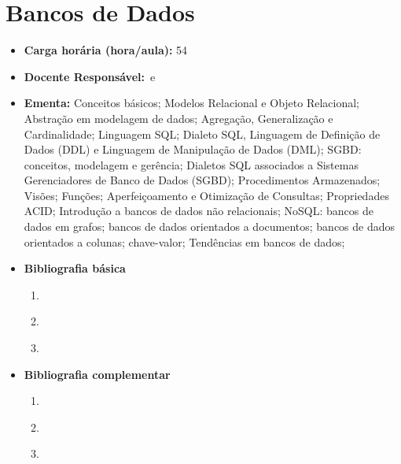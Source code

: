\documentclass[11pt,fleqn]{book} %
\begin{document}

\newpage
\section{Bancos de Dados}\label{disc:bancodados}

\begin{itemize}
	\item \textbf{Carga horária (hora/aula):} 54
	\item \textbf{Docente Responsável:}~e~
	\item \textbf{Ementa:} 
	Conceitos básicos;
	Modelos Relacional e Objeto Relacional;
	Abstração em modelagem de dados; 
	Agregação, Generalização e Cardinalidade; 
	Linguagem SQL; 
	Dialeto SQL, Linguagem de Definição de Dados (DDL) e Linguagem de Manipulação de Dados (DML);
	SGBD: conceitos, modelagem e gerência;
	Dialetos SQL associados a Sistemas Gerenciadores de Banco de Dados (SGBD);
	Procedimentos Armazenados; 
	Visões; 
	Funções; 
	Aperfeiçoamento e Otimização de Consultas;
	Propriedades ACID;
	Introdução a bancos de dados não relacionais;
	NoSQL: bancos de dados em grafos; bancos de dados orientados a documentos; bancos de dados orientados a colunas; chave-valor;
	Tendências em bancos de dados;
	\item \textbf{Bibliografia básica}
	\begin{enumerate}
		\item~\cite{silberschatz2016}
		\item~\cite{date2004}
		\item~\cite{heuser2009}
	\end{enumerate}
	\item \textbf{Bibliografia complementar}
	\begin{enumerate}
		\item~\cite{sadalage2019}
		\item~\cite{casanova2005}
		\item~\cite{milani2008}
	\end{enumerate}	
\end{itemize}


\newpage
\end{document}
